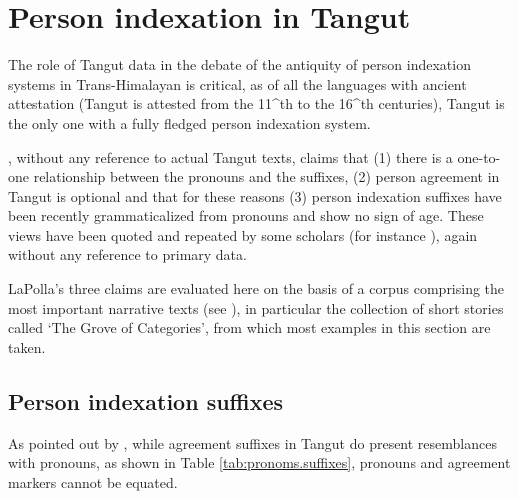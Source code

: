 \documentclass[oldfontcommands,oneside,a4paper,11pt]{article}
\newcommand{\tgf}[1]{\begin{tabular}{l}\mo{#1}\\{\tiny #1}\end{tabular}}
\newcommand{\tinynb}[1]{\tiny#1}
\begin{document}
\section{Person indexation in Tangut}
The role of Tangut data in the debate of the antiquity of person indexation systems in Trans-Himalayan is critical, as of all the languages with ancient attestation (Tangut is attested from the 11^{th} to the 16^{th} centuries), Tangut is the only one with a fully fledged person indexation system.



\citet{lapolla92}, without any reference to actual Tangut texts, claims that (1) there is a one-to-one relationship between the pronouns and the suffixes, (2) person agreement in Tangut is optional and that for these reasons (3) person indexation suffixes have been recently grammaticalized from pronouns and show no sign of age. These views have been quoted and repeated by some scholars (for instance \citealt{zeisler15eat}), again without any reference to primary data.

LaPolla's three claims are evaluated here on the basis of a corpus comprising the most important narrative texts (see \citealt[8-9]{jacques14esquisse}), in particular the collection of short stories called  `The Grove of Categories', from which most examples in this section are taken.


\subsection{Person indexation suffixes}
As pointed out by \citet{kepping94conjugation}, while agreement suffixes in Tangut do present  resemblances with pronouns, as shown in Table \ref{tab:pronoms.suffixes}, pronouns and agreement markers cannot be equated. 
\end{document}
